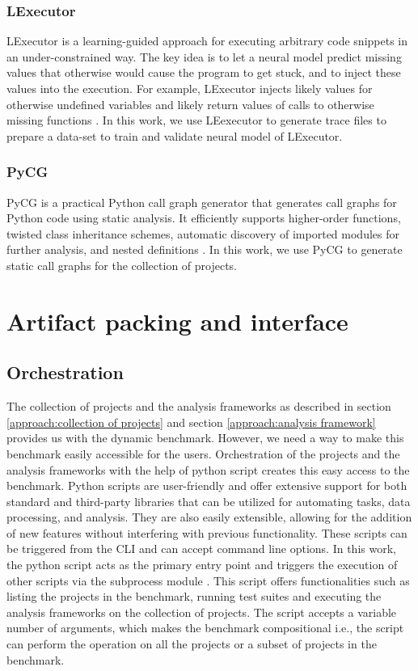 \subsubsection{LExecutor}
LExecutor is a learning-guided approach for executing arbitrary code snippets in an under-constrained way.
The key idea is to let a neural model predict missing values that otherwise would cause the program to get stuck, and to inject these values into the execution.
For example, LExecutor injects likely values for otherwise undefined variables and likely return values of calls to otherwise missing functions \cite{LExecutor_2023}. 
In this work, we use LEexecutor to generate trace files to prepare a data-set to train and validate neural model of LExecutor.
\subsubsection{PyCG}
PyCG is a practical Python call graph generator that generates call graphs for Python code using static analysis.
It efficiently supports higher-order functions, twisted class inheritance schemes, automatic discovery of imported modules for further analysis, and nested definitions \cite{PyCG_2021}.
In this work, we use PyCG to generate static call graphs for the collection of projects.

\section{Artifact packing and interface}
\label{approach:artifact packaging and interface}

\subsection{Orchestration}
\label{approach:python script}
The collection of projects and the analysis frameworks as described in section \ref{approach:collection of projects} and section \ref{approach:analysis framework} provides us with the dynamic benchmark. 
However, we need a way to make this benchmark easily accessible for the users.
Orchestration of the projects and the analysis frameworks with the help of python script creates this easy access to the benchmark.
Python scripts are user-friendly and offer extensive support for both standard and third-party libraries that can be utilized for automating tasks, data processing, and analysis.
They are also easily extensible, allowing for the addition of new features without interfering with previous functionality.
These scripts can be triggered from the CLI and can accept command line options.
In this work, the python script acts as the primary entry point and triggers the execution of other scripts via the subprocess module \cite{python_subprocess}.
This script offers functionalities such as listing the projects in the benchmark, running test suites and executing the analysis frameworks on the collection of projects.  
The script accepts a variable number of arguments, which makes the benchmark compositional i.e., the script can perform the operation on all the projects or a subset of projects in the benchmark. 

